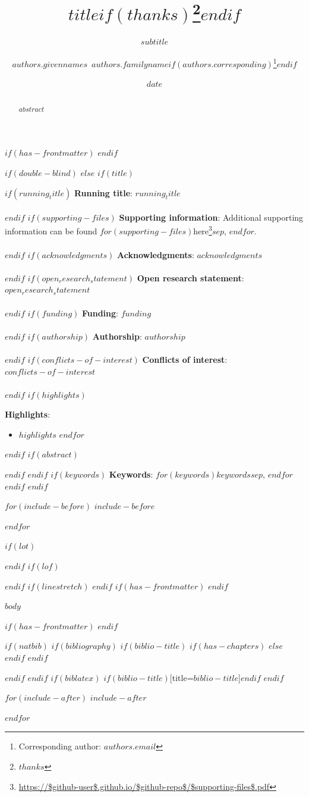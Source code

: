 \documentclass[12pt]{article}
\title{$title$$if(thanks)$\thanks{$thanks$}$endif$}
\subtitle{$subtitle$}
\author[$for(authors.affiliations)$$authors.affiliations$$sep$,$endfor$]{$authors.givennames$~$authors.familyname$$if(authors.corresponding)$\thanks{Corresponding author: $authors.email$}$endif$}
\affil[$affiliations.index$]{$affiliations.name$}
\date{$date$}
\DeclareRobustCommand{\href}[2]{#2\footnote{\url{#1}}}
\begin{document}
$if(has-frontmatter)$
\frontmatter
$endif$

$if(double-blind)$
$else$
$if(title)$
\maketitle
$if(running_title)$
\small{{\bf Running title}: $running_title$}\\\\
$endif$
$if(supporting-files)$
\small{{\bf Supporting information}: Additional supporting information can be found $for(supporting-files)$\href{https://$github-user$.github.io/$github-repo$/$supporting-files$.pdf}{here}$sep$, $endfor$.}\\\\
$endif$
$if(acknowledgments)$
\small{{\bf Acknowledgments}: $acknowledgments$}\\\\
$endif$
$if(open_research_statement)$
\small{{\bf Open research statement}: $open_research_statement$}\\\\
$endif$
$if(funding)$
\small{{\bf Funding}: $funding$}\\\\
$endif$
$if(authorship)$
\small{{\bf Authorship}: $authorship$}\\\\
$endif$
$if(conflicts-of-interest)$
\small{{\bf Conflicts of interest}: $conflicts-of-interest$}\\\\
$endif$
$if(highlights)$
\small{{\bf Highlights}:\vspace{-1.5em}
\begin{itemize}
  $for(highlights)$
    \item $highlights$
  $endfor$
\end{itemize}}
$endif$
$if(abstract)$
\begin{abstract}
$abstract$
\end{abstract}
$endif$
$endif$
$if(keywords)$
\hspace{1cm}\small{{\bf Keywords}: $for(keywords)$$keywords$$sep$, $endfor$}
$endif$
$endif$

$for(include-before)$
$include-before$

$endfor$

$if(lot)$
\listoftables
$endif$
$if(lof)$
\listoffigures
$endif$
$if(linestretch)$
$endif$
$if(has-frontmatter)$
\mainmatter
$endif$

$body$

$if(has-frontmatter)$
\backmatter
$endif$

\newpage

$if(natbib)$
$if(bibliography)$
$if(biblio-title)$
$if(has-chapters)$
\renewcommand\bibname{$biblio-title$}
$else$
\renewcommand\refname{$biblio-title$}
$endif$
$endif$


$endif$
$endif$
$if(biblatex)$
\printbibliography$if(biblio-title)$[title=$biblio-title$]$endif$
$endif$

$for(include-after)$
$include-after$

$endfor$
\end{document}
